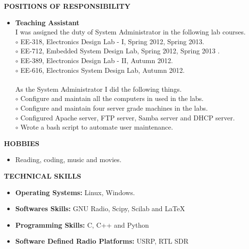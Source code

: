 \documentclass[a4paper,10pt]{article}
\begin{document}
 \colorbox{titleColor}{\parbox{6.5in}{\textbf{POSITIONS OF RESPONSIBILITY}}}

 \begin{itemize}
 \setlength{\itemsep}{1pt}
 \item \textbf{Teaching Assistant} \\
I was assigned the duty of System Administrator in the following lab courses.\\
$\circ$ EE-318, Electronics Design Lab - I, Spring 2012, Spring 2013. \\
$\circ$ EE-712, Embedded System Design Lab, Spring 2012, Spring 2013 . \\ 
$\circ$ EE-389, Electronics Design Lab - II, Autumn 2012.  \\
$\circ$ EE-616, Electronics System Design Lab, Autumn 2012. \\
\qquad \\
As the System Administrator I did the following things. \\
$\circ$ Configure and maintain all the computers in used in the labs. \\
$\circ$ Configure and maintain four server grade machines in the labs. \\
$\circ$ Configured Apache server, FTP server, Samba server and DHCP server. \\
$\circ$ Wrote a bash script to automate user maintenance.
 \end{itemize}

\colorbox{titleColor}{\parbox{6.5in}{\textbf{HOBBIES}}}

  \begin{itemize}
 \setlength{\itemsep}{1pt}
    \item Reading, coding, music and movies.
  \end{itemize}
  
 \colorbox{titleColor}{\parbox{6.5in}{\textbf{TECHNICAL SKILLS}}}
 
 \begin{itemize}
 \setlength{\itemsep}{1pt}
 \item \textbf{{Operating Systems:}} Linux, Windows.
 \item \textbf{{Softwares Skills:}} GNU Radio, Scipy, Scilab and \LaTeX
 \item \textbf{{Programming Skills:}} C, C++ and Python
 \item \textbf{{Software Defined Radio Platforms:}} USRP, RTL SDR
 \end{itemize}
\end{document}
